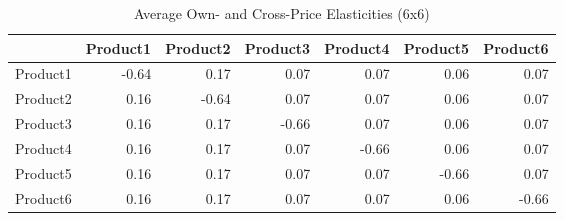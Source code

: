 \begin{table}[ht]
\centering
\begin{tabular}{rrrrrrr}
  \hline
 & Product1 & Product2 & Product3 & Product4 & Product5 & Product6 \\ 
  \hline
Product1 & -0.64 & 0.17 & 0.07 & 0.07 & 0.06 & 0.07 \\ 
  Product2 & 0.16 & -0.64 & 0.07 & 0.07 & 0.06 & 0.07 \\ 
  Product3 & 0.16 & 0.17 & -0.66 & 0.07 & 0.06 & 0.07 \\ 
  Product4 & 0.16 & 0.17 & 0.07 & -0.66 & 0.06 & 0.07 \\ 
  Product5 & 0.16 & 0.17 & 0.07 & 0.07 & -0.66 & 0.07 \\ 
  Product6 & 0.16 & 0.17 & 0.07 & 0.07 & 0.06 & -0.66 \\ 
   \hline
\end{tabular}
\caption{Average Own- and Cross-Price Elasticities (6x6)} 
\label{tab:elasticities}
\end{table}
